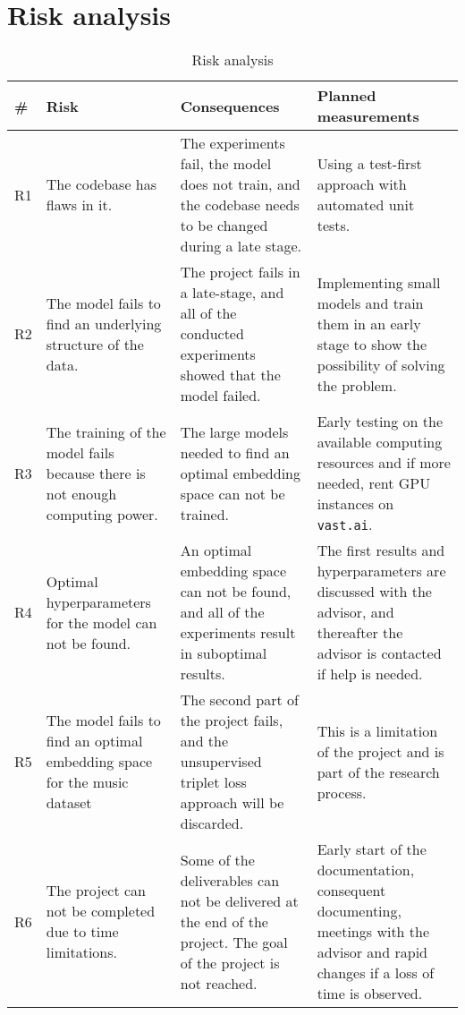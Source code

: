\clearpage
\landscapevalues

\section{Risk analysis}
\label{sec:Risk-Analysis}
\begin{table}[htb]
    \centering
    \caption{Risk analysis}
	\label{tab:Risk-Analysis}
    \begin{tabular}{p{} | p{} | p{} | p{}}
        \toprule
        \textbf{\#} & \textbf{Risk} & \textbf{Consequences} & \textbf{Planned measurements} \\ 
        \midrule[1pt]
        R1 & The codebase has flaws in it. & The experiments fail, the model does not train, and the codebase needs to be changed during a late stage. & Using a test-first approach with automated unit tests. \\
        \hline
        R2 & The model fails to find an underlying structure of the data. & The project fails in a late-stage, and all of the conducted experiments showed that the model failed. & Implementing small models and train them in an early stage to show the possibility of solving the problem.  \\
        \hline
        R3 & The training of the model fails because there is not enough computing power. & The large models needed to find an optimal embedding space can not be trained. & Early testing on the available computing resources and if more needed, rent \gls{GPU} instances on \texttt{vast.ai}. \\
        \hline
        R4 & Optimal hyperparameters for the model can not be found. & An optimal embedding space can not be found, and all of the experiments result in suboptimal results. & The first results and hyperparameters are discussed with the advisor, and thereafter the advisor is contacted if help is needed. \\
        \hline
        R5 & The model fails to find an optimal embedding space for the music dataset & The second part of the project fails, and the unsupervised triplet loss approach will be discarded. & This is a limitation of the project and is part of the research process. \\
        \hline
        R6 & The project can not be completed due to time limitations. & Some of the deliverables can not be delivered at the end of the project. The goal of the project is not reached. & Early start of the documentation, consequent documenting, meetings with the advisor and rapid changes if a loss of time is observed. \\ 
        \bottomrule
    \end{tabular}
\end{table}
